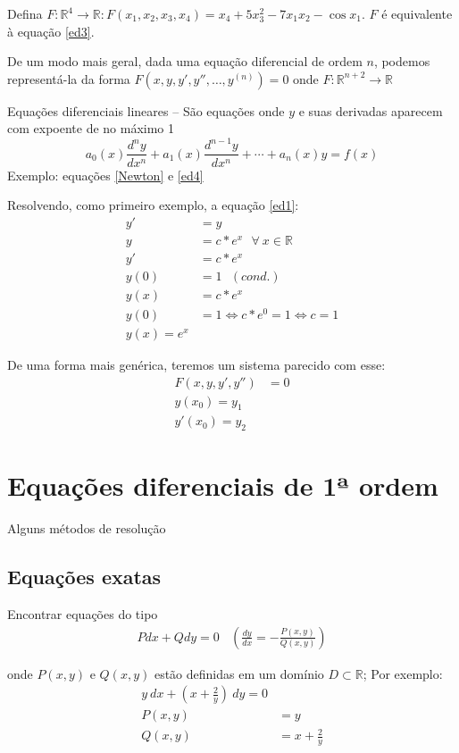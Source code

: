 \documentclass[12pt,openany, letterpaper]{book}
\begin{document}
{{Defina $F: \mathds{R}^4 \rightarrow \mathds{R}: F(x_1,x_2,x_3,x_4) = x_4 + 5x_3^2 - 7x_1x_2 - \cos x_1$. $F$ é equivalente à equação \ref{ed3}.

De um modo mais geral, dada uma equação diferencial de ordem $n$, podemos representá-la da forma $F(x, y, y', y'', \hdots, y^{(n)}) = 0$ onde $F:\mathds{R}^{n+2} \rightarrow \mathds{R}$

Equações diferenciais lineares -- São equações onde $y$ e suas derivadas aparecem com expoente de no máximo 1 $$ a_0(x)\frac{d^n y}{d x^n}+ a_1(x) \frac{d^{n-1} y}{d x^n} + \cdots + a_n(x)y = f(x) $$ Exemplo: equações \ref{Newton} e \ref{ed4}

Resolvendo, como primeiro exemplo, a equação \ref{ed1}: \begin{align*}
    y' &= y \\
    y &= c*e^x \ \ \ \forall \ x \in \mathds{R} \\
    y' &= c*e^x \\
    y(0) &= 1 \ \ \  (cond.) \\
    y(x) &= c*e^x \\
    y(0) &= 1 \Longleftrightarrow c*e^0 = 1 \Longleftrightarrow c = 1 \\
    y(x) = e^x
\end{align*}

De uma forma mais genérica, teremos um sistema parecido com esse: \begin{align*}
    F(x,y,y',y'') &= 0 \\
    y(x_0) = y_1 \\
    y'(x_0) = y_2
\end{align*}


\section{Equações diferenciais de 1ª ordem}{Alguns métodos de resolução}

\subsection{Equações exatas}

\hspace{5mm} Encontrar equações do tipo \begin{align}
    Pdx + Qdy = 0 \ \ \ \ \left(\frac{dy}{dx} = - \frac{P(x,y)}{Q(x,y)}\right) \label{ed5}
\end{align}

onde $P(x,y)$ e $Q(x,y)$ estão definidas em um domínio $D \subset \mathds{R}$; Por exemplo: \begin{align*}
    y \ dx + \left(x + \frac{2}{y}\right)\ dy = 0 \\
    P(x,y) &= y \\
    Q(x,y) &= x + \frac{2}{y}
\end{align*}

}}
\end{document}
